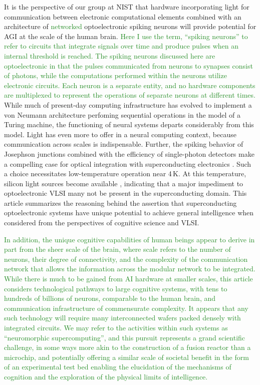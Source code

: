 \documentclass[twocolumn]{article}
\begin{document}
It is the perspective of our group at NIST that hardware incorporating light for communication between electronic computational elements combined with an architecture of \textcolor{ForestGreen}{networked} optoelectronic spiking neurons will provide potential for AGI at the scale of the human brain. \textcolor{ForestGreen}{Here I use the term, ``spiking neurons'' to refer to circuits that integrate signals over time and produce pulses when an internal threshold is reached. The spiking neurons discussed here are optoelectronic in that the pulses communicated from neurons to synapses consist of photons, while the computations performed within the neurons utilize electronic circuits. Each neuron is a separate entity, and no hardware components are multiplexed to represent the operations of separate neurons at different times.} While much of present-day computing infrastructure has evolved to implement a von Neumann architecture perfoming sequential operations in the model of a Turing machine, the functioning of neural systems departs considerably from this model. Light has even more to offer in a neural computing context, because communication across scales is indispensable. Further, the spiking behavior of Josephson junctions combined with the efficiency of single-photon detectors make a compelling case for optical integration with superconducting electronics \cite{shbu2017,sh2018}. Such a choice necessitates low-temperature operation near 4\,K. At this temperature, silicon light sources become available \cite{buch2017}, indicating that a major impediment to optoelectronic VLSI many not be present in the superconducting domain. This article summarizes the reasoning behind the assertion that superconducting optoelectronic systems have unique potential to achieve general intelligence when considered from the perspectives of cognitive science and VLSI.

\textcolor{ForestGreen}{In addition, the unique cognitive capabilities of human beings appear to derive in part from the sheer scale of the brain, where scale refers to the number of neurons, their degree of connectivity, and the complexity of the communication network that allows the information across the modular network to be integrated. While there is much to be gained from AI hardware at smaller scales, this article considers technological pathways to large cognitive systems, with tens to hundreds of billions of neurons, comparable to the human brain, and communication infrastructure of commensurate complexity. It appears that any such technology will require many interconnected wafers packed densely with integrated circuits. We may refer to the activities within such systems as ``neuromorphic supercomputing'', and this pursuit represents a grand scientific challenge, in some ways more akin to the construction of a fusion reactor than a microchip, and potentially offering a similar scale of societal benefit in the form of an experimental test bed enabling the elucidation of the mechanisms of cognition and the exploration of the physical limits of intelligence.}
\end{document}
